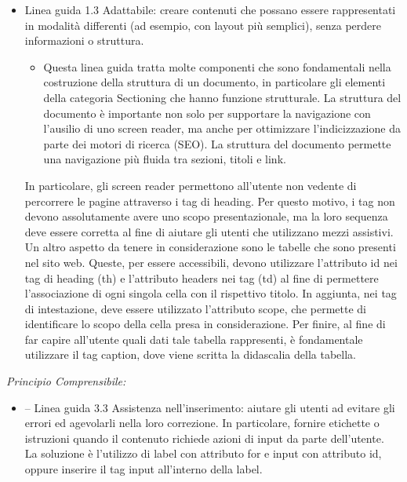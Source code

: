\documentclass[a4paper,final,12pt]{report}
\begin{document}
\begin{itemize}
\item Linea guida 1.3 Adattabile: creare contenuti che possano essere rappresentati in modalità differenti (ad esempio, con layout più semplici), senza perdere informazioni o struttura.
\begin{itemize}
\item Questa linea guida tratta molte componenti che sono fondamentali nella costruzione della struttura di un documento, in particolare gli elementi della categoria Sectioning che hanno funzione strutturale. La struttura del documento è importante non solo per supportare la navigazione con l'ausilio di uno screen reader, ma anche per ottimizzare l'indicizzazione da parte dei motori di ricerca (SEO). La struttura del documento permette una navigazione più fluida tra sezioni, titoli e link.
\end{itemize}
In particolare, gli screen reader permettono all'utente non vedente di percorrere le pagine attraverso i tag di heading. Per questo motivo, i tag non devono assolutamente avere uno scopo presentazionale, ma la loro sequenza deve essere corretta al fine di aiutare gli utenti che utilizzano mezzi assistivi.\\
Un altro aspetto da tenere in considerazione sono le tabelle che sono presenti nel sito web. Queste, per essere accessibili, devono utilizzare l'attributo id nei tag di heading (th) e l'attributo headers nei tag (td) al fine di permettere l'associazione di ogni singola cella con il rispettivo titolo. In aggiunta, nei tag di intestazione, deve essere utilizzato l'attributo scope, che permette di identificare lo scopo della cella presa in considerazione. Per finire, al fine di far capire all'utente quali dati tale tabella rappresenti, è fondamentale utilizzare il tag caption, dove viene scritta la didascalia della tabella.
\end{itemize}
\newpage
\emph{Principio Comprensibile:}
\begin{itemize}
\item – Linea guida 3.3 Assistenza nell'inserimento: aiutare gli utenti ad evitare gli errori ed agevolarli nella loro correzione. In particolare, fornire etichette o istruzioni quando il contenuto richiede azioni di input da parte dell'utente.\\
La soluzione è l'utilizzo di label con attributo for e input con attributo id, oppure inserire il tag input all'interno della label.
\end{itemize}
\end{document}
